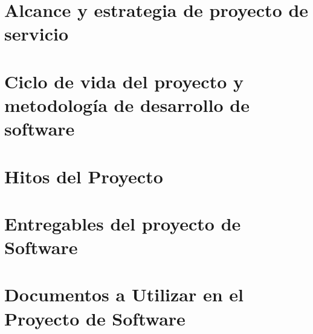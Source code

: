
\section{Alcance y estrategia de proyecto de servicio}
\label{sec:Alcance y estrategia de proyecto de servicio}



   






\section{Ciclo de vida del proyecto y metodología de desarrollo de software}
\label{sec:Ciclo de vida del proyecto}


\section{Hitos del Proyecto}

\section{Entregables del proyecto de Software}

\section{Documentos a Utilizar en el Proyecto de Software}
